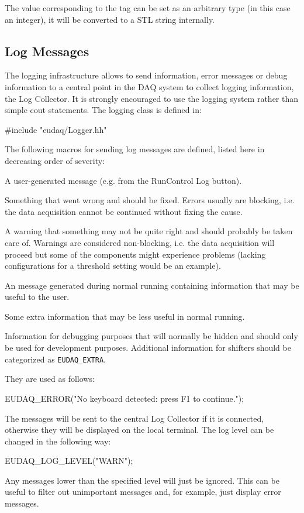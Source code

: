 The value corresponding to the tag can be set as an arbitrary type (in this case an integer),
it will be converted to a STL string internally.

\subsection{Log Messages}
The logging infrastructure allows to send information, error messages or debug information to a central point in the DAQ system to collect logging information, the Log Collector.
It is strongly encouraged to use the logging system rather than simple cout statements.
The logging class is defined in:
\begin{listing}
#include "eudaq/Logger.hh"
\end{listing}

The following macros for sending log messages are defined,
listed here in decreasing order of severity:
\begin{description}

A user-generated message (e.g. from the RunControl Log button).

Something that went wrong and should be fixed. Errors usually are blocking, i.e. the data acquisition cannot be continued without fixing the cause.

A warning that something may not be quite right and should probably be taken care of. Warnings are considered non-blocking, i.e. the data acquisition will proceed but some of the components might experience problems (lacking configurations for a threshold setting would be an example).

An message generated during normal running containing information that may be useful to the user.

Some extra information that may be less useful in normal running.

Information for debugging purposes that will normally be hidden and should only be used for development purposes. Additional information for shifters should be categorized as \texttt{EUDAQ\_EXTRA}.

\end{description}

They are used as follows:
\begin{listing}
EUDAQ_ERROR("No keyboard detected: press F1 to continue.");
\end{listing}

The messages will be sent to the central Log Collector if it is connected,
otherwise they will be displayed on the local terminal.
The log level can be changed in the following way:
\begin{listing}
EUDAQ_LOG_LEVEL("WARN");
\end{listing}

Any messages lower than the specified level will just be ignored.
This can be useful to filter out unimportant messages and, for example, just display error messages.
